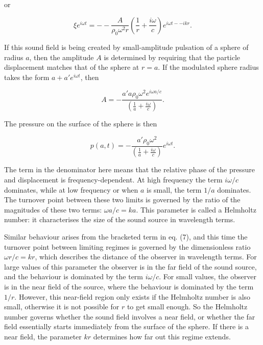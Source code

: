   or 

  $$\xi e^{i \omega t} = -- \frac{A}{\rho_0 \omega^2 r} \left( \frac{1}{r} 
  +\frac{i \omega}{c} \right) e^{i\omega t -- ikr} . \tag{7}$$ 

  If this sound field is being created by small-amplitude pulsation of a sphere 
  of radius $a$, then the amplitude $A$ is determined by requiring that the 
  particle displacement matches that of the sphere at $r=a$. If the modulated 
  sphere radius takes the form $a+a' e^{i \omega t}$, then 

  $$A=-\dfrac{a' a \rho_0 \omega^2 e^{i \omega a/c}}{\left( \frac{1}{a} 
  +\frac{i \omega}{c} \right)} . \tag{8}$$ 

  The pressure on the surface of the sphere is then 

  $$p(a,t)=-\dfrac{a' \rho_0 \omega^2}{\left( \frac{1}{a} +\frac{i \omega}{c} 
  \right)} e^{i \omega t}. \tag{9}$$ 

  The term in the denominator here means that the relative phase of the 
  pressure and displacement is frequency-dependent. At high frequency the term 
  $i \omega /c$ dominates, while at low frequency or when $a$ is small, the 
  term $1/a$ dominates. The turnover point between these two limits is governed 
  by the ratio of the magnitudes of these two terms: $\omega a/c = ka$. This 
  parameter is called a Helmholtz number: it characterises the size of the 
  sound source in wavelength terms. 

  Similar behaviour arises from the bracketed term in eq. (7), and this time 
  the turnover point between limiting regimes is governed by the dimensionless 
  ratio $\omega r/c = kr$, which describes the distance of the observer in 
  wavelength terms. For large values of this parameter the observer is in the 
  far field of the sound source, and the behaviour is dominated by the term $i 
  \omega /c$. For small values, the observer is in the near field of the 
  source, where the behaviour is dominated by the term $1/r$. However, this 
  near-field region only exists if the Helmholtz number is also small, 
  otherwise it is not possible for $r$ to get small enough. So the Helmholtz 
  number governs whether the sound field involves a near field, or whether the 
  far field essentially starts immediately from the surface of the sphere. If 
  there is a near field, the parameter $kr$ determines how far out this regime 
  extends. 